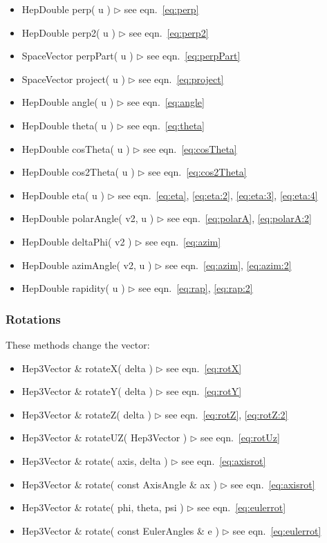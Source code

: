 \documentclass[twoside,12pt]{article}
\newcommand {\see}[1] {\hfill$\triangleright$ see eqn.~#1}
\newenvironment{shortlist}{%
\begin{itemize}
\setlength{\itemsep}{0pt}
\setlength{\parskip}{0pt}
}{%
\end{itemize}
}
\begin{document}
\begin{shortlist}
  \item HepDouble perp( u ) \see{\ref{eq:perp}}
  \item HepDouble perp2( u ) \see{\ref{eq:perp2}}
  \item SpaceVector perpPart( u ) \see{\ref{eq:perpPart}}
  \item SpaceVector project( u ) \see{\ref{eq:project}}
  \item HepDouble angle( u ) \see{\ref{eq:angle}}
  \item HepDouble theta( u ) \see{\ref{eq:theta}}
  \item HepDouble cosTheta( u ) \see{\ref{eq:cosTheta}}
  \item HepDouble cos2Theta( u ) \see{\ref{eq:cos2Theta}}
  \item HepDouble eta( u ) \see{\ref{eq:eta}, \ref{eq:eta:2}, \ref{eq:eta:3}, \ref{eq:eta:4}}
  \item HepDouble polarAngle( v2, u ) \see{\ref{eq:polarA}, \ref{eq:polarA:2}}
  \item HepDouble deltaPhi( v2 ) \see{\ref{eq:azim}}
  \item HepDouble azimAngle( v2, u ) \see{\ref{eq:azim}, \ref{eq:azim:2}}
  \item HepDouble rapidity( u ) \see{\ref{eq:rap}, \ref{eq:rap:2}}
\end{shortlist}

\subsubsection{Rotations}

\noindent
These methods change the vector:

\begin{shortlist}
  \item Hep3Vector \& rotateX( delta ) \see{\ref{eq:rotX}}
  \item Hep3Vector \& rotateY( delta ) \see{\ref{eq:rotY}}
  \item Hep3Vector \& rotateZ( delta ) \see{\ref{eq:rotZ}, \ref{eq:rotZ:2}}
  \item Hep3Vector \& rotateUZ( Hep3Vector ) \see{\ref{eq:rotUz}}
\end{shortlist}

\begin{shortlist}
  \item Hep3Vector \& rotate( axis, delta ) \see{\ref{eq:axisrot}}
  \item Hep3Vector \& rotate( const AxisAngle \& ax ) \see{\ref{eq:axisrot}}
  \item Hep3Vector \& rotate( phi, theta, psi ) \see{\ref{eq:eulerrot}}
  \item Hep3Vector \& rotate( const EulerAngles \& e ) \see{\ref{eq:eulerrot}}
\end{shortlist}
\end{document}
